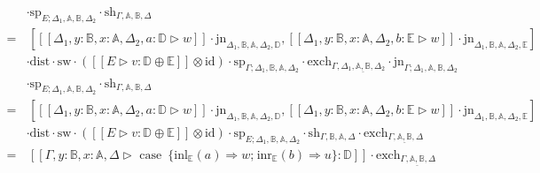 \begin{equation*}
\begin{split}
    & \cdot \text{sp}_{E; \Delta_{1},\mathbb{A},\mathbb{B},  \Delta_{2}} \cdot \text{sh}_{\Gamma,\mathbb{A}, \mathbb{B},\Delta} \\
    = &\hspace{2pt}  [[\![\Delta_{1},y:\mathbb{B}, x:\mathbb{A},  \Delta_{2}, a:\mathbb{D} \triangleright w ]\!]  \cdot \text{jn}_{\Delta_{1},\mathbb{B}, \mathbb{A}, \Delta_{2},\mathbb{D}}, [\![\Delta_{1},y:\mathbb{B}, x:\mathbb{A},  \Delta_{2}, b:\mathbb{E} \triangleright w ]\!] \cdot \text{jn}_{\Delta_{1},\mathbb{B}, \mathbb{A}, \Delta_{2},\mathbb{E}}]  \\  
    &\cdot \text{dist}  \cdot   \text{sw} \cdot  ([\![E \triangleright v : \mathbb{D} \oplus \mathbb{E}  ]\!] \otimes \text{id}) \cdot \text{sp}_{\Gamma;  \Delta_{1},\mathbb{B},\mathbb{A},  \Delta_{2}} \cdot \text{exch}_{\Gamma,  \Delta_{1},\underline{\mathbb{A},\mathbb{B}},  \Delta_{2}} \cdot \text{jn}_{\Gamma;  \Delta_{1},\mathbb{A},\mathbb{B},  \Delta_{2}} \\ 
    &\cdot \text{sp}_{E; \Delta_{1},\mathbb{A},\mathbb{B},  \Delta_{2}} \cdot \text{sh}_{\Gamma,\mathbb{A}, \mathbb{B},\Delta}\\
    = &\hspace{2pt}  [[\![\Delta_{1},y:\mathbb{B}, x:\mathbb{A},  \Delta_{2}, a:\mathbb{D} \triangleright w ]\!]  \cdot \text{jn}_{\Delta_{1},\mathbb{B}, \mathbb{A}, \Delta_{2},\mathbb{D}}, [\![\Delta_{1},y:\mathbb{B}, x:\mathbb{A},  \Delta_{2}, b:\mathbb{E} \triangleright w ]\!] \cdot \text{jn}_{\Delta_{1},\mathbb{B}, \mathbb{A}, \Delta_{2},\mathbb{E}}]   \\ 
    & \cdot \text{dist}  \cdot   \text{sw}  \cdot  ([\![E \triangleright v : \mathbb{D} \oplus \mathbb{E}  ]\!] \otimes \text{id}) \cdot  \text{sp}_{E; \Delta_{1},\mathbb{B},\mathbb{A},  \Delta_{2}} \cdot \text{sh}_{\Gamma,\mathbb{B},\mathbb{A}, \Delta} \cdot \text{exch}_{\Gamma, \underline{\mathbb{A},  \mathbb{B}} , \Delta } \\
    = & \hspace{2pt} [\![\Gamma,y:\mathbb{B}, x:\mathbb{A}, \Delta \triangleright \text{ case }  \hspace{2pt}  \{\text{inl}_{\mathbb{E}} (a) \Rightarrow w ; \hspace{1pt} \text{inr}_{\mathbb{E}} (b) \Rightarrow u\}: \mathbb{D}]\!] \cdot \text{exch}_{\Gamma,\underline{\mathbb{A},  \mathbb{B}}, \Delta} 
\end{split}
\end{equation*}

\hspace{5pt}

